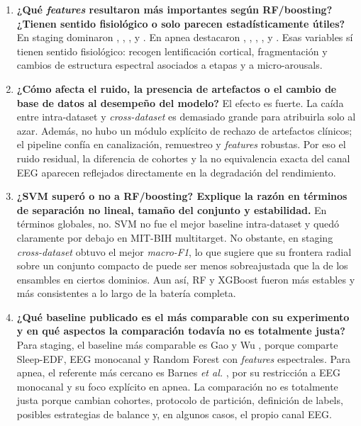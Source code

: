 \begin{enumerate}[leftmargin=*]
\item \textbf{¿Qu\'e \emph{features} resultaron m\'as importantes seg\'un RF/boosting? ¿Tienen sentido fisiol\'ogico o solo parecen estad\'isticamente \'utiles?} En staging dominaron , , ,  y . En apnea destacaron , , , ,  y . Esas variables s\'i tienen sentido fisiol\'ogico: recogen lentificaci\'on cortical, fragmentaci\'on y cambios de estructura espectral asociados a etapas y a micro-arousals.

\item \textbf{¿C\'omo afecta el ruido, la presencia de artefactos o el cambio de base de datos al desempe\~no del modelo?} El efecto es fuerte. La ca\'ida entre intra-dataset y \emph{cross-dataset} es demasiado grande para atribuirla solo al azar. Adem\'as, no hubo un m\'odulo expl\'icito de rechazo de artefactos cl\'inicos; el pipeline conf\'ia en canalizaci\'on, remuestreo y \emph{features} robustas. Por eso el ruido residual, la diferencia de cohortes y la no equivalencia exacta del canal EEG aparecen reflejados directamente en la degradaci\'on del rendimiento.

\item \textbf{¿SVM super\'o o no a RF/boosting? Explique la raz\'on en t\'erminos de separaci\'on no lineal, tama\~no del conjunto y estabilidad.} En t\'erminos globales, no. SVM no fue el mejor baseline intra-dataset y qued\'o claramente por debajo en MIT-BIH multitarget. No obstante, en staging \emph{cross-dataset} obtuvo el mejor \emph{macro-F1}, lo que sugiere que su frontera radial sobre un conjunto compacto de  puede ser menos sobreajustada que la de los ensambles en ciertos dominios. Aun as\'i, RF y XGBoost fueron m\'as estables y m\'as consistentes a lo largo de la bater\'ia completa.

\item \textbf{¿Qu\'e baseline publicado es el m\'as comparable con su experimento y en qu\'e aspectos la comparaci\'on todav\'ia no es totalmente justa?} Para staging, el baseline m\'as comparable es Gao y Wu \cite{gao2023psdrf}, porque comparte Sleep-EDF, EEG monocanal y Random Forest con \emph{features} espectrales. Para apnea, el referente m\'as cercano es Barnes \emph{et al.} \cite{barnes2022apneaeegcnn}, por su restricci\'on a EEG monocanal y su foco expl\'icito en apnea. La comparaci\'on no es totalmente justa porque cambian cohortes, protocolo de partici\'on, definici\'on de labels, posibles estrategias de balance y, en algunos casos, el propio canal EEG.


\end{enumerate}
